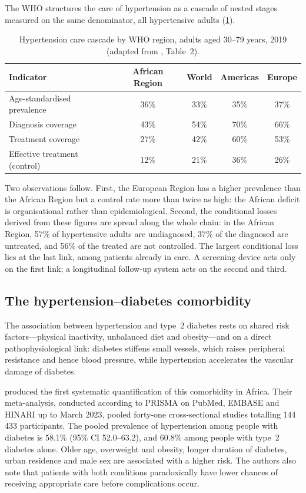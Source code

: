 \documentclass[12pt,a4paper,oneside]{report}
\begin{document}
The WHO structures the care of hypertension as a cascade of nested stages measured on the same denominator, all hypertensive adults (\cref{tab:cascade}).

\begin{table}[htbp]
\centering\small
\caption{Hypertension care cascade by WHO region, adults aged 30--79 years, 2019 (adapted from \cite{who2023hypertension}, Table~2).}\label{tab:cascade}
\begin{tabularx}{\textwidth}{@{}X c c c c@{}}
\toprule
\textbf{Indicator} & \textbf{African Region} & \textbf{World} & \textbf{Americas} & \textbf{Europe} \\
\midrule
Age-standardised prevalence & 36\% & 33\% & 35\% & 37\% \\
Diagnosis coverage & 43\% & 54\% & 70\% & 66\% \\
Treatment coverage & 27\% & 42\% & 60\% & 53\% \\
Effective treatment (control) & 12\% & 21\% & 36\% & 26\% \\
\bottomrule
\end{tabularx}
\end{table}

Two observations follow. First, the European Region has a higher prevalence than the African Region but a control rate more than twice as high: the African deficit is organisational rather than epidemiological. Second, the conditional losses derived from these figures are spread along the whole chain: in the African Region, 57\% of hypertensive adults are undiagnosed, 37\% of the diagnosed are untreated, and 56\% of the treated are not controlled. The largest conditional loss lies at the last link, among patients already in care. A screening device acts only on the first link; a longitudinal follow-up system acts on the second and third.

\subsection{The hypertension--diabetes comorbidity}\label{sec:comorbidity}

The association between hypertension and type~2 diabetes rests on shared risk factors---physical inactivity, unbalanced diet and obesity---and on a direct pathophysiological link: diabetes stiffens small vessels, which raises peripheral resistance and hence blood pressure, while hypertension accelerates the vascular damage of diabetes.

\Textcite{hinneh2023} produced the first systematic quantification of this comorbidity in Africa. Their meta-analysis, conducted according to PRISMA on PubMed, EMBASE and HINARI up to March 2023, pooled forty-one cross-sectional studies totalling 144\,433 participants. The pooled prevalence of hypertension among people with diabetes is 58.1\% (95\% CI 52.0--63.2), and 60.8\% among people with type~2 diabetes alone. Older age, overweight and obesity, longer duration of diabetes, urban residence and male sex are associated with a higher risk. The authors also note that patients with both conditions paradoxically have lower chances of receiving appropriate care before complications occur.
\end{document}
